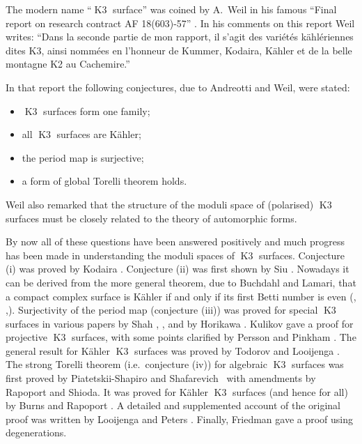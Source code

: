 \documentclass[a4paper,11pt]{article}
\newcommand{\Kthree}{\mathop{\mathrm {K3}}\nolimits}
\begin{document}
The modern name ``$\Kthree$ surface'' was coined by A.~Weil in his
famous ``Final report on research contract AF 18(603)-57'' \cite[Vol
  II, pp 390--395]{Wei}. In his comments on this report \cite[Vol II,
  p 546]{Wei} Weil writes: ``Dans la seconde partie de mon rapport, il
s'agit des vari\'et\'es k\"ahl\'eriennes dites K3, ainsi nomm\'ees en
l'honneur de Kummer, Kodaira, K\"ahler et de la belle montagne K2 au
Cachemire.''

In that report the following conjectures, due to Andreotti and Weil,
were stated:
\begin{itemize}
\item[{\rm (i)}] $\Kthree$ surfaces form one family;
\item[{\rm (ii)}] all $\Kthree$ surfaces are K\"ahler;
\item[{\rm (iii)}] the period map is surjective;
\item[{\rm (iv)}] a form of global Torelli theorem holds.
\end{itemize}
Weil also remarked that the structure of the moduli space of
(polarised) $\Kthree$ surfaces must be closely related to the theory
of automorphic forms. 

By now all of these questions have been answered positively and much
progress has been made in understanding the moduli spaces of $\Kthree$
surfaces. Conjecture (i) was proved by Kodaira \cite[Part I, theorem
  19]{Kod}.  Conjecture (ii) was first shown by Siu
\cite[Section 14]{Siu}.  Nowadays it can be derived from the more
general theorem, due to Buchdahl and Lamari, that a compact complex
surface is K\"ahler if and only if its first Betti number is even
(\cite[Theorem IV.3.1]{BHPV}, \cite{Bu},\cite{La}).  Surjectivity of
the period map (conjecture (iii)) was proved for special $\Kthree$
surfaces in various papers by Shah \cite{Sha1}, \cite{Sha2},
\cite{Sha3} and by Horikawa \cite{Hor}.  Kulikov \cite{Kul} gave a
proof for projective $\Kthree$ surfaces, with some points clarified by
Persson and Pinkham \cite{PP}. The general result for K\"ahler
$\Kthree$ surfaces was proved by Todorov \cite{Tod} and Looijenga
\cite{Lo}.  The strong Torelli theorem (i.e.\ conjecture (iv)) for
algebraic $\Kthree$ surfaces was first proved by Piatetskii-Shapiro
and Shafarevich~\cite{P-SS} with amendments by Rapoport and Shioda. It
was proved for K\"ahler $\Kthree$ surfaces (and hence for all) by
Burns and Rapoport \cite{BR}.  A detailed and supplemented account of
the original proof was written by Looijenga and Peters \cite{LP}.
Finally, Friedman \cite{Fr} gave a proof using degenerations.
\end{document}
